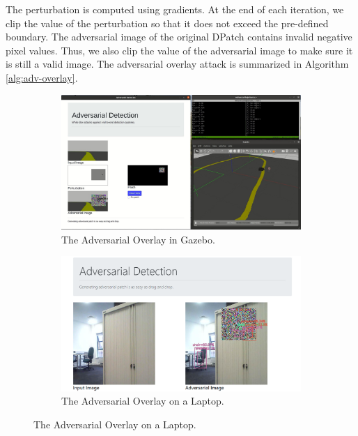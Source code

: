 The perturbation is computed using gradients. At the end of each iteration, we clip the value of the perturbation so that it does not exceed the pre-defined boundary. The adversarial image of the original DPatch \citep{liu2018dpatch} contains invalid negative pixel values. Thus, we also clip the value of the adversarial image to make sure it is still a valid image. The adversarial overlay attack is summarized in Algorithm \ref{alg:adv-overlay}.

\begin{figure}[b]
\centering
\begin{subfigure}[b]{0.31\textwidth}
    \centering
    \includegraphics[width=\textwidth]{figures/chapter_detection/detection/gazebo.jpg}
    \caption{The Adversarial Overlay in Gazebo.}
    \label{fig:gazebo}
\end{subfigure}
\hfill
\begin{subfigure}[b]{0.31\textwidth}
    \centering
    \includegraphics[width=\textwidth]{figures/chapter_detection/detection/pc.png}
    \caption{The Adversarial Overlay on a Laptop.}
    \label{fig:pc}
\end{subfigure}

\end{figure}
